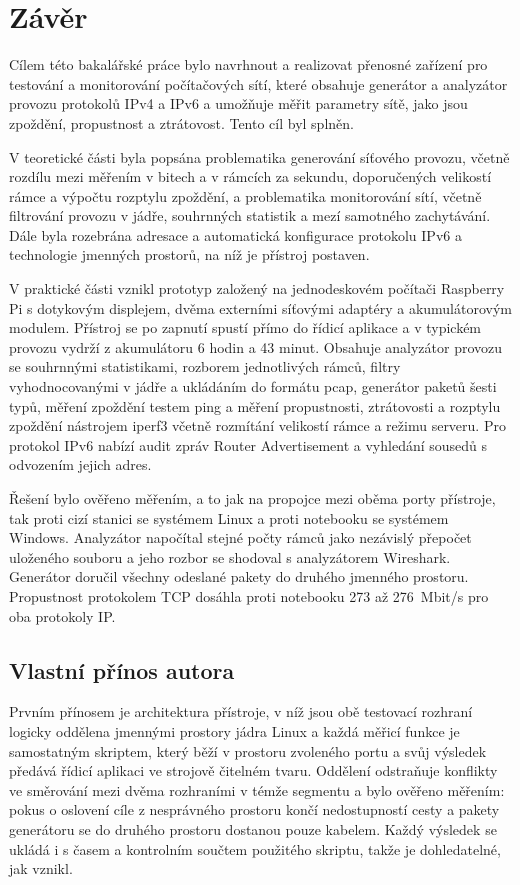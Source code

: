 \chapter{Závěr}
\label{sec:zaver}

Cílem této bakalářské práce bylo navrhnout a realizovat přenosné zařízení pro testování a monitorování počítačových sítí, které obsahuje generátor a analyzátor provozu protokolů IPv4 a IPv6 a umožňuje měřit parametry sítě, jako jsou zpoždění, propustnost a ztrátovost. Tento cíl byl splněn.

V teoretické části byla popsána problematika generování síťového provozu, včetně rozdílu mezi měřením v bitech a v rámcích za sekundu, doporučených velikostí rámce a výpočtu rozptylu zpoždění, a problematika monitorování sítí, včetně filtrování provozu v jádře, souhrnných statistik a mezí samotného zachytávání. Dále byla rozebrána adresace a automatická konfigurace protokolu IPv6 a technologie jmenných prostorů, na níž je přístroj postaven.

V praktické části vznikl prototyp založený na jednodeskovém počítači Raspberry Pi s dotykovým displejem, dvěma externími síťovými adaptéry a akumulátorovým modulem. Přístroj se po zapnutí spustí přímo do řídicí aplikace a v typickém provozu vydrží z akumulátoru 6 hodin a 43 minut. Obsahuje analyzátor provozu se souhrnnými statistikami, rozborem jednotlivých rámců, filtry vyhodnocovanými v jádře a ukládáním do formátu pcap, generátor paketů šesti typů, měření zpoždění testem ping a měření propustnosti, ztrátovosti a rozptylu zpoždění nástrojem iperf3 včetně rozmítání velikostí rámce a režimu serveru. Pro protokol IPv6 nabízí audit zpráv Router Advertisement a vyhledání sousedů s odvozením jejich adres.

Řešení bylo ověřeno měřením, a to jak na propojce mezi oběma porty přístroje, tak proti cizí stanici se systémem Linux a proti notebooku se systémem Windows. Analyzátor napočítal stejné počty rámců jako nezávislý přepočet uloženého souboru a jeho rozbor se shodoval s analyzátorem Wireshark. Generátor doručil všechny odeslané pakety do druhého jmenného prostoru. Propustnost protokolem TCP dosáhla proti notebooku 273 až 276~Mbit/s pro oba protokoly IP.

\section*{Vlastní přínos autora}

Prvním přínosem je architektura přístroje, v níž jsou obě testovací rozhraní logicky oddělena jmennými prostory jádra Linux a každá měřicí funkce je samostatným skriptem, který běží v prostoru zvoleného portu a svůj výsledek předává řídicí aplikaci ve strojově čitelném tvaru. Oddělení odstraňuje konflikty ve směrování mezi dvěma rozhraními v témže segmentu a bylo ověřeno měřením: pokus o oslovení cíle z nesprávného prostoru končí nedostupností cesty a pakety generátoru se do druhého prostoru dostanou pouze kabelem. Každý výsledek se ukládá i s časem a kontrolním součtem použitého skriptu, takže je dohledatelné, jak vznikl.

